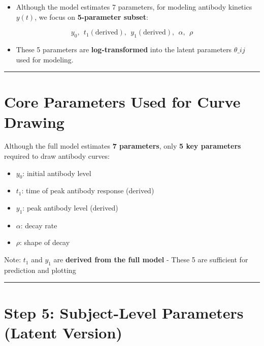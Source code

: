 \documentclass[
]{article}
\providecommand{\tightlist}{%
  \setlength{\itemsep}{0pt}\setlength{\parskip}{0pt}}\usepackage{longtable,booktabs,array}
\begin{document}
\begin{itemize}
\tightlist
\item
  Although the model estimates 7 parameters, for modeling antibody
  kinetics \(y(t)\), we focus on \textbf{5-parameter subset}:
\end{itemize}

\[y_0,\ \ t_1 (\text{derived}),\ \  y_1 (\text{derived}),\ \  \alpha,\ \  \rho\]

\begin{itemize}
\tightlist
\item
  These 5 parameters are \textbf{log-transformed} into the latent
  parameters \(\theta\_{ij}\) used for modeling.
\end{itemize}

\begin{center}\rule{0.5\linewidth}{0.5pt}\end{center}

\section{Core Parameters Used for Curve
Drawing}\label{core-parameters-used-for-curve-drawing}

Although the full model estimates \textbf{7 parameters}, only \textbf{5
key parameters} required to draw antibody curves:

\begin{itemize}
\tightlist
\item
  \(y_0\): initial antibody level
\item
  \(t_1\): time of peak antibody response (derived)
\item
  \(y_1\): peak antibody level (derived)
\item
  \(\alpha\): decay rate
\item
  \(\rho\): shape of decay
\end{itemize}

Note: \(t_1\) and \(y_1\) are \textbf{derived from the full model} -
These 5 are sufficient for prediction and plotting

\begin{center}\rule{0.5\linewidth}{0.5pt}\end{center}

\section{Step 5: Subject-Level Parameters (Latent
Version)}\label{step-5-subject-level-parameters-latent-version}
\end{document}

